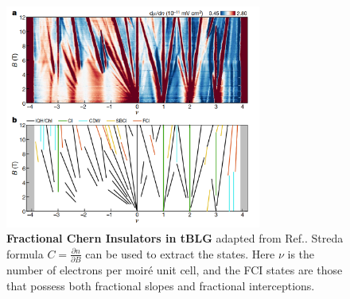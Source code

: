 \begin{figure}[!htp]
    \centering
    \includegraphics[width=0.75\textwidth]{figures/Introduction/tBLG_FQHE.png}
    \caption{\textbf{Fractional Chern Insulators in tBLG} adapted from Ref.\cite{xie2021fractional}. Streda formula $C=\frac{\partial n}{\partial B}$ can be used to extract the states. Here $\nu$ is the number of electrons per moir\'e unit cell, and the FCI states are those that possess both fractional slopes and fractional interceptions.}
    \label{fig:tBLG_FQHE}
\end{figure}



